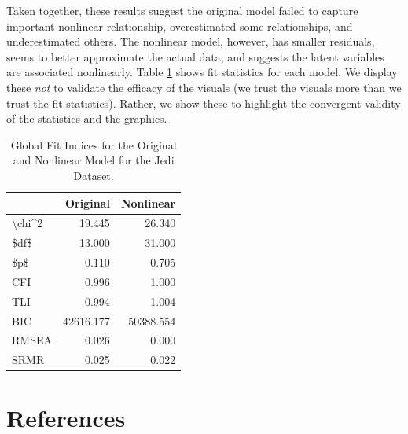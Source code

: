\documentclass[
  english,
  doc]{apa6}
\begin{document}
Taken together, these results suggest the original model failed to capture important nonlinear relationship, overestimated some relationships, and underestimated others. The nonlinear model, however, has smaller residuals, seems to better approximate the actual data, and suggests the latent variables are associated nonlinearly. Table \ref{tab:tabresults} shows fit statistics for each model. We display these \emph{not} to validate the efficacy of the visuals (we trust the visuals more than we trust the fit statistics). Rather, we show these to highlight the convergent validity of the statistics and the graphics.

\begin{table}

\caption{\label{tab:tabresults}Global Fit Indices for the Original and Nonlinear Model for the Jedi Dataset.}
\centering
\begin{tabular}[t]{l|r|r}
\hline
  & Original & Nonlinear\\
\hline
\textbackslash{}chi\textasciicircum{}2 & 19.445 & 26.340\\
\hline
\$df\$ & 13.000 & 31.000\\
\hline
\$p\$ & 0.110 & 0.705\\
\hline
CFI & 0.996 & 1.000\\
\hline
TLI & 0.994 & 1.004\\
\hline
BIC & 42616.177 & 50388.554\\
\hline
RMSEA & 0.026 & 0.000\\
\hline
SRMR & 0.025 & 0.022\\
\hline
\end{tabular}
\end{table}

\hypertarget{references}{%
\section*{References}\label{references}}
\end{document}
